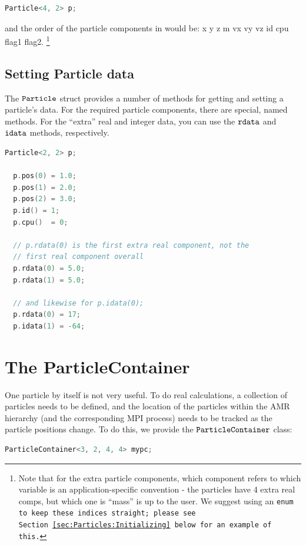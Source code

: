 \begin{lstlisting}[language=cpp]
  Particle<4, 2> p;
\end{lstlisting}

and the order of the particle components in would be: x y z m vx vy vz id cpu flag1 flag2. \footnote{Note that for the extra particle components, which component refers to which
variable is an application-specific convention - the particles have 4 extra real comps, but which one is ``mass'' is up to the user. We suggest using an \tt{enum} to keep these indices straight; please see Section~\ref{sec:Particles:Initializing} below for an example of this.} 

\subsection{Setting Particle data}

The $\tt{Particle}$ struct provides a number of methods for getting and setting a particle's data. For the required particle components, there are special, named methods. For the 
``extra'' real and integer data, you can use the $\tt{rdata}$ and $\tt{idata}$ methods, respectively. 

\begin{lstlisting}[language=cpp]
  Particle<2, 2> p;

  p.pos(0) = 1.0;
  p.pos(1) = 2.0;
  p.pos(2) = 3.0;
  p.id() = 1;
  p.cpu()  = 0;

  // p.rdata(0) is the first extra real component, not the 
  // first real component overall
  p.rdata(0) = 5.0;
  p.rdata(1) = 5.0;

  // and likewise for p.idata(0);
  p.rdata(0) = 17;
  p.idata(1) = -64;  
\end{lstlisting}

\section{The ParticleContainer}
\label{sec:Particles:ParticleContainer}
 
One particle by itself is not very useful. To do real calculations, a collection of particles needs to be defined, and the location of the particles within the AMR hierarchy
(and the corresponding MPI process) needs to be tracked as the particle positions change. To do this, we provide the $\tt{ParticleContainer}$ class:

\begin{lstlisting}[language=cpp]
  ParticleContainer<3, 2, 4, 4> mypc;
\end{lstlisting}
   

